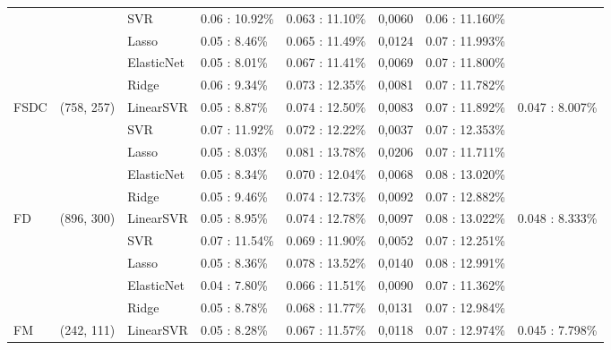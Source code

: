 \begin{tabular}{lllllrll}
        &              &         SVR &  0.06 : 10.92\% &  0.063  : 11.10\% &       0,0060 &  0.06 : 11.160\% &                  \\ \cline{3-8}
        &              &       Lasso &   0.05 : 8.46\% &  0.065  : 11.49\% &       0,0124 &  0.07 : 11.993\% &                  \\ \cline{3-8}
        &              &  ElasticNet &   0.05 : 8.01\% &  0.067  : 11.41\% &       0,0069 &  0.07 : 11.800\% &                  \\ \cline{3-8}
        &              &       Ridge &   0.06 : 9.34\% &  0.073  : 12.35\% &       0,0081 &  0.07 : 11.782\% &                  \\ \cline{3-8}
   FSDC &   (758, 257) &   LinearSVR &   0.05 : 8.87\% &  0.074  : 12.50\% &       0,0083 &  0.07 : 11.892\% &   0.047 : 8.007\% \\ \cline{1-8}
        &              &         SVR &  0.07 : 11.92\% &  0.072  : 12.22\% &       0,0037 &  0.07 : 12.353\% &                  \\ \cline{3-8}
        &              &       Lasso &   0.05 : 8.03\% &  0.081  : 13.78\% &       0,0206 &  0.07 : 11.711\% &                  \\ \cline{3-8}
        &              &  ElasticNet &   0.05 : 8.34\% &  0.070  : 12.04\% &       0,0068 &  0.08 : 13.020\% &                  \\ \cline{3-8}
        &              &       Ridge &   0.05 : 9.46\% &  0.074  : 12.73\% &       0,0092 &  0.07 : 12.882\% &                  \\ \cline{3-8}
     FD &   (896, 300) &   LinearSVR &   0.05 : 8.95\% &  0.074  : 12.78\% &       0,0097 &  0.08 : 13.022\% &   0.048 : 8.333\% \\ \cline{1-8}
        &              &         SVR &  0.07 : 11.54\% &  0.069  : 11.90\% &       0,0052 &  0.07 : 12.251\% &                  \\ \cline{3-8}
        &              &       Lasso &   0.05 : 8.36\% &  0.078  : 13.52\% &       0,0140 &  0.08 : 12.991\% &                  \\ \cline{3-8}
        &              &  ElasticNet &   0.04 : 7.80\% &  0.066  : 11.51\% &       0,0090 &  0.07 : 11.362\% &                  \\ \cline{3-8}
        &              &       Ridge &   0.05 : 8.78\% &  0.068  : 11.77\% &       0,0131 &  0.07 : 12.984\% &                  \\ \cline{3-8}
     FM &   (242, 111) &   LinearSVR &   0.05 : 8.28\% &  0.067  : 11.57\% &       0,0118 &  0.07 : 12.974\% &   0.045 : 7.798\% \\ \cline{1-8}

\end{tabular}
